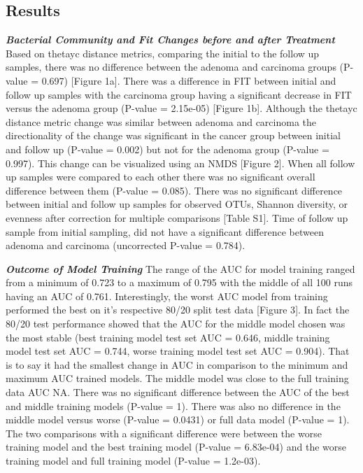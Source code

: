 \documentclass[12pt,]{article}
\begin{document}
\newpage

\subsection{Results}\label{results}

\textbf{\emph{Bacterial Community and Fit Changes before and after
Treatment}} Based on thetayc distance metrics, comparing the initial to
the follow up samples, there was no difference between the adenoma and
carcinoma groups (P-value = 0.697) {[}Figure 1a{]}. There was a
difference in FIT between initial and follow up samples with the
carcinoma group having a significant decrease in FIT versus the adenoma
group (P-value = 2.15e-05) {[}Figure 1b{]}. Although the thetayc
distance metric change was similar between adenoma and carcinoma the
directionality of the change was significant in the cancer group between
initial and follow up (P-value = 0.002) but not for the adenoma group
(P-value = 0.997). This change can be visualized using an NMDS {[}Figure
2{]}. When all follow up samples were compared to each other there was
no significant overall difference between them (P-value = 0.085). There
was no significant difference between initial and follow up samples for
observed OTUs, Shannon diversity, or evenness after correction for
multiple comparisons {[}Table S1{]}. Time of follow up sample from
initial sampling, did not have a significant difference between adenoma
and carcinoma (uncorrected P-value = 0.784).

\textbf{\emph{Outcome of Model Training}} The range of the AUC for model
training ranged from a minimum of 0.723 to a maximum of 0.795 with the
middle of all 100 runs having an AUC of 0.761. Interestingly, the worst
AUC model from training performed the best on it's respective 80/20
split test data {[}Figure 3{]}. In fact the 80/20 test performance
showed that the AUC for the middle model chosen was the most stable
(best training model test set AUC = 0.646, middle training model test
set AUC = 0.744, worse training model test set AUC = 0.904). That is to
say it had the smallest change in AUC in comparison to the minimum and
maximum AUC trained models. The middle model was close to the full
training data AUC NA. There was no significant difference between the
AUC of the best and middle training models (P-value = 1). There was also
no difference in the middle model versus worse (P-value = 0.0431) or
full data model (P-value = 1). The two comparisons with a significant
difference were between the worse training model and the best training
model (P-value = 6.83e-04) and the worse training model and full
training model (P-value = 1.2e-03).
\end{document}

